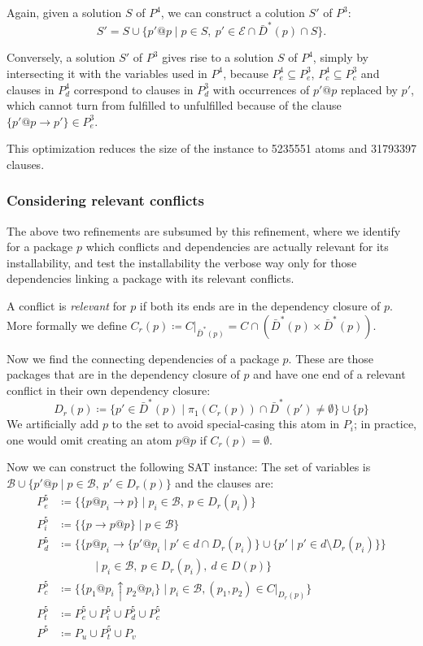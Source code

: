 \documentclass[halfparskip,11pt]{scrartcl}
\begin{document}
Again, given a solution $S$ of $P^4$, we can construct a colution $S'$ of $P^3$:
\[
S' = S \cup \{p'@p \mid p\in S,\ p'\in \mathcal E \cap \bar D^*(p) \cap S\}.
\]

Conversely, a solution $S'$ of $P^3$ gives rise to a solution $S$ of $P^4$, simply by intersecting it with the variables used in $P^4$, because $P^4_e \subseteq P^3_e$, $P^4_c \subseteq P^3_c$ and clauses in $P^4_d$ correspond to clauses in $P^3_d$ with occurrences of $p'@p$ replaced by $p'$, which cannot turn from fulfilled to unfulfilled because of the clause $\{p'@p \to p'\} \in P^3_e$.

This optimization reduces the size of the instance to 5235551 atoms and 31793397 clauses.


\subsubsection{Considering relevant conflicts}

The above two refinements are subsumed by this refinement, where we identify for a package $p$ which conflicts and dependencies are actually relevant for its installability, and test the installability the verbose way only for those dependencies linking a package with its relevant conflicts.

A conflict is \emph{relevant} for $p$ if both its ends are in the dependency closure of $p$. More formally we define $C_r(p) \coloneqq C |_{\bar D^*(p)} = C\cap (\bar D^*(p) \times \bar D^*(p))$.

Now we find the connecting dependencies of a package $p$. These are those packages that are in the dependency closure of $p$ and have one end of a relevant conflict in their own dependency closure:
\[
D_r(p) \coloneqq \{p' \in \bar D^*(p) \mid \pi_1(C_r(p)) \cap \bar D^*(p') \ne \emptyset\} \cup \{p\}
\]
We artificially add $p$ to the set to avoid special-casing this atom in $P_i$; in practice, one would omit creating an atom $p@p$ if $C_r(p)=\emptyset$.

Now we can construct the following SAT instance:
The set of variables is $\mathcal B \cup \{p'@p \mid p \in \mathcal B,\  p'\in D_r(p)\}$ and the clauses are: 
\begin{align*}
P^5_e &\coloneqq \{ \{p@p_i \to p\} \mid p_i \in\mathcal B,\ p\in D_r(p_i)\} \\
P^5_i &\coloneqq \{ \{p \to  p@p\} \mid p \in\mathcal B\} \\
P^5_d &\coloneqq \{ \{p@p_i \to \{p'@p_i \mid p'\in d\cap D_r(p_i)\} \cup \{p' \mid p'\in d\setminus D_r(p_i)\}\} \\
&\quad\quad\quad \mid p_i \in \mathcal B,\  p\in D_r(p_i),\ d \in D(p)\}\\
P^5_c &\coloneqq \{ \{p_1@p_i \uparrow p_2@p_i\} \mid p_i\in \mathcal B, (p_1,p_2)\in C|_{D_r(p)}\}\\
P^5_t &\coloneqq P^5_e \cup P^5_i \cup P^5_d \cup P^5_c \\
P^5 &\coloneqq P_u \cup P^5_t \cup P_v
\end{align*}
\end{document}
